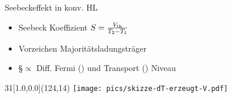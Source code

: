 \begin{frame}{Seebeckeffekt in konv. HL}%
\begin{itemize}
\item <1-> Seebeck Koeffizient $\S=\frac{V_\text{th}}{T_2-T_1}$
\item <1-> Vorzeichen \pfeil Majoritätsladungsträger %
\item <2-> \S $\propto$ Diff. Fermi (\Ef) und Transport (\Et) Niveau %
\end{itemize}
\begin{textblock}{31}[1.0,0.0](124,14)
\texttt{[image: pics/skizze-dT-erzeugt-V.pdf]}
\end{textblock}
%
\end{frame}

